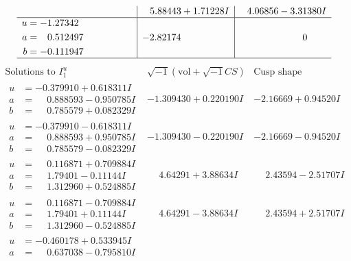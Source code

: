 \documentclass[1p]{elsarticle_modified}
\theoremstyle{definition}
\newcommand{\I}{\sqrt{-1}}
\begin{document}
$$\begin{array}{c|c|c}
 & \phantom{-}5.88443 + 1.71228 I & \phantom{-}4.06856 - 3.31380 I \\ \hline\begin{aligned}
u &= -1.27342\phantom{ +0.000000I} \\
a &= \phantom{-}0.512497\phantom{ +0.000000I} \\
b &= -0.111947\phantom{ +0.000000I}\end{aligned}
 & -2.82174\phantom{ +0.000000I} & \phantom{-0.000000 } 0\\
 \hline 
 \end{array}$$\newpage$$\begin{array}{c|c|c}  
\text{Solutions to }I^u_{1}& \I (\text{vol} + \sqrt{-1}CS) & \text{Cusp shape}\\
 \hline 
\begin{aligned}
u &= -0.379910 + 0.618311 I \\
a &= \phantom{-}0.888593 - 0.950785 I \\
b &= \phantom{-}0.785579 + 0.082329 I\end{aligned}
 & -1.309430 + 0.220190 I & -2.16669 + 0.94520 I \\ \hline\begin{aligned}
u &= -0.379910 - 0.618311 I \\
a &= \phantom{-}0.888593 + 0.950785 I \\
b &= \phantom{-}0.785579 - 0.082329 I\end{aligned}
 & -1.309430 - 0.220190 I & -2.16669 - 0.94520 I \\ \hline\begin{aligned}
u &= \phantom{-}0.116871 + 0.709884 I \\
a &= \phantom{-}1.79401 - 0.11144 I \\
b &= \phantom{-}1.312960 + 0.524885 I\end{aligned}
 & \phantom{-}4.64291 + 3.88634 I & \phantom{-}2.43594 - 2.51707 I \\ \hline\begin{aligned}
u &= \phantom{-}0.116871 - 0.709884 I \\
a &= \phantom{-}1.79401 + 0.11144 I \\
b &= \phantom{-}1.312960 - 0.524885 I\end{aligned}
 & \phantom{-}4.64291 - 3.88634 I & \phantom{-}2.43594 + 2.51707 I \\ \hline\begin{aligned}
u &= -0.460178 + 0.533945 I \\
a &= \phantom{-}0.637038 - 0.795810 I \\

\end{aligned}
\end{array}$$
\end{document}
